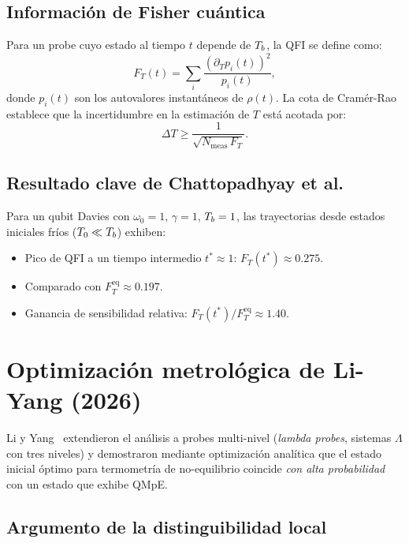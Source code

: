 \subsection{Información de Fisher cuántica}

Para un probe cuyo estado al tiempo $t$ depende de $T_{b}$, la QFI se define 
como:
\begin{equation}
    F_{T}(t) = \sum_{i} \frac{(\partial_{T} p_i(t))^2}{p_i(t)}, 
\end{equation}
%
donde $p_i(t)$ son los autovalores instantáneos de $\rho(t)$. La cota de 
Cramér-Rao establece que la incertidumbre en la estimación de $T$ está acotada 
por:
\begin{equation}
    \Delta T \geq \frac{1}{\sqrt{N_{\mathrm{meas}} \, F_{T}}}.
    \label{eq:cramer_rao}
\end{equation}

\subsection{Resultado clave de Chattopadhyay et al.}

Para un qubit Davies con $\omega_0 = 1$, $\gamma = 1$, $T_{b} = 1$, las trayectorias 
desde estados iniciales fríos ($T_{0} \ll T_{b}$) exhiben:
\begin{itemize}
\item Pico de QFI a un tiempo intermedio $t^{\ast} \approx 1$: 
$F_{T}(t^{\ast}) \approx 0.275$.
\item Comparado con $F_{T}^{\mathrm{eq}} \approx 0.197$.
\item Ganancia de sensibilidad relativa: $F_{T}(t^{\ast})/F_{T}^{\mathrm{eq}} \approx 1.40$.
\end{itemize}

\section{Optimización metrológica de Li-Yang (2026)}

Li y Yang~\cite{liyang2026} extendieron el análisis a probes multi-nivel 
(\emph{lambda probes}, sistemas $\Lambda$ con tres niveles) y demostraron 
mediante optimización analítica que el estado inicial óptimo para termometría 
de no-equilibrio coincide \emph{con alta probabilidad} con un estado que 
exhibe QMpE.

\subsection{Argumento de la distinguibilidad local}

